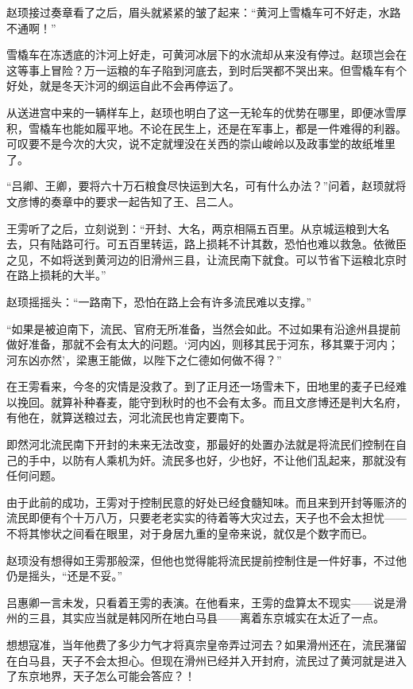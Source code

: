 赵顼接过奏章看了之后，眉头就紧紧的皱了起来：“黄河上雪橇车可不好走，水路不通啊！”

雪橇车在冻透底的汴河上好走，可黄河冰层下的水流却从来没有停过。赵顼岂会在这等事上冒险？万一运粮的车子陷到河底去，到时后哭都不哭出来。但雪橇车有个好处，就是冬天汴河的纲运自此不会再停运了。

从送进宫中来的一辆样车上，赵顼也明白了这一无轮车的优势在哪里，即便冰雪厚积，雪橇车也能如履平地。不论在民生上，还是在军事上，都是一件难得的利器。可叹要不是今次的大灾，说不定就埋没在关西的崇山峻岭以及政事堂的故纸堆里了。

“吕卿、王卿，要将六十万石粮食尽快运到大名，可有什么办法？”问着，赵顼就将文彦博的奏章中的要求一起告知了王、吕二人。

王雱听了之后，立刻说到：“开封、大名，两京相隔五百里。从京城运粮到大名去，只有陆路可行。可五百里转运，路上损耗不计其数，恐怕也难以救急。依微臣之见，不如将送到黄河边的旧滑州三县，让流民南下就食。可以节省下运粮北京时在路上损耗的大半。”

赵顼摇摇头：“一路南下，恐怕在路上会有许多流民难以支撑。”

“如果是被迫南下，流民、官府无所准备，当然会如此。不过如果有沿途州县提前做好准备，那就不会有太大的问题。‘河内凶，则移其民于河东，移其粟于河内；河东凶亦然’，梁惠王能做，以陛下之仁德如何做不得？”

在王雱看来，今冬的灾情是没救了。到了正月还一场雪未下，田地里的麦子已经难以挽回。就算补种春麦，能守到秋时的也不会有太多。而且文彦博还是判大名府，有他在，就算送粮过去，河北流民也肯定要南下。

即然河北流民南下开封的未来无法改变，那最好的处置办法就是将流民们控制在自己的手中，以防有人乘机为奸。流民多也好，少也好，不让他们乱起来，那就没有任何问题。

由于此前的成功，王雱对于控制民意的好处已经食髓知味。而且来到开封等赈济的流民即便有个十万八万，只要老老实实的待着等大灾过去，天子也不会太担忧——不将其惨状之间看在眼里，对于身居九重的皇帝来说，就仅是个数字而已。

赵顼没有想得如王雱那般深，但他也觉得能将流民提前控制住是一件好事，不过他仍是摇头，“还是不妥。”

吕惠卿一言未发，只看着王雱的表演。在他看来，王雱的盘算太不现实——说是滑州的三县，其实应当就是韩冈所在地白马县——离着东京城实在太近了一点。

想想寇准，当年他费了多少力气才将真宗皇帝弄过河去？如果滑州还在，流民潴留在白马县，天子不会太担心。但现在滑州已经并入开封府，流民过了黄河就是进入了东京地界，天子怎么可能会答应？！

